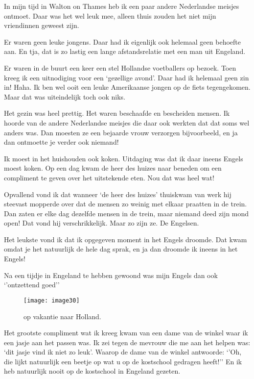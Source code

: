 In mijn tijd in Walton on Thames heb ik een paar andere Nederlandse meisjes ontmoet. Daar was het wel leuk mee, alleen thuis zouden het niet mijn vriendinnen geweest zijn. 

Er waren geen leuke jongens. Daar had ik eigenlijk ook helemaal geen behoefte aan. En tja, dat is zo lastig een lange afstandsrelatie met een man uit Engeland. 

Er waren in de buurt een keer een stel Hollandse voetballers op bezoek. Toen kreeg ik een uitnodiging voor een ‘gezellige avond’. Daar had ik helemaal geen zin in! Haha. Ik ben wel ooit een leuke Amerikaanse jongen op de fiets tegengekomen. Maar dat was uiteindelijk toch ook niks.

Het gezin was heel prettig. Het waren beschaafde en bescheiden mensen. Ik hoorde van de andere Nederlandse meisjes die daar ook werkten dat dat soms wel anders was. Dan moesten ze een bejaarde vrouw verzorgen bijvoorbeeld, en ja dan ontmoette je verder ook niemand! 

Ik moest in het huishouden ook koken. Uitdaging was dat ik daar ineens Engels moest koken. Op een dag kwam de heer des huizes naar beneden om een compliment te geven over het uitstekende eten. Nou dat was heel wat! 

Opvallend vond ik dat wanneer ‘de heer des huizes’ thuiskwam van werk hij steevast mopperde over dat de mensen zo weinig met elkaar praatten in de trein. Dan zaten er elke dag dezelfde mensen in de trein, maar niemand deed zijn mond open! Dat vond hij verschrikkelijk. Maar zo zijn ze. De Engelsen. 

Het leukste vond ik dat ik opgegeven moment in het Engels droomde. Dat kwam omdat je het natuurlijk de hele dag sprak, en ja dan droomde ik ineens in het Engels! 

Na een tijdje in Engeland te hebben gewoond was mijn Engels dan ook ‘’ontzettend goed’’ 

\begin{figure}[h]
    \texttt{[image: image30]}
    \caption{op vakantie naar Holland.}
\end{figure}

Het grootste compliment wat ik kreeg kwam van een dame van de winkel waar ik een jasje aan het passen was. Ik zei tegen de mevrouw die me aan het helpen was: ‘dit jasje vind ik niet zo leuk’. Waarop de dame van de winkel antwoorde: ‘’Oh, die lijkt natuurlijk een beetje op wat u op de kostschool gedragen heeft!’’ En ik heb natuurlijk nooit op de kostschool in Engeland gezeten. 


